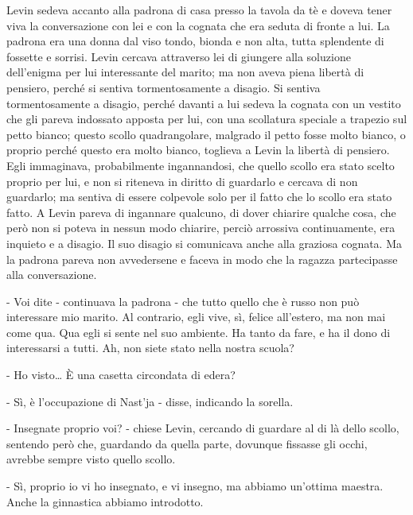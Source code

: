 Levin sedeva accanto alla padrona di casa presso la tavola da tè e doveva tener viva la conversazione con lei e con la cognata che era seduta di fronte a lui. La padrona era una donna dal viso tondo, bionda e non alta, tutta splendente di fossette e sorrisi. Levin cercava attraverso lei di giungere alla soluzione dell'enigma per lui interessante del marito; ma non aveva piena libertà di pensiero, perché si sentiva tormentosamente a disagio. Si sentiva tormentosamente a disagio, perché davanti a lui sedeva la cognata con un vestito che gli pareva indossato apposta per lui, con una scollatura speciale a trapezio sul petto bianco; questo scollo quadrangolare, malgrado il petto fosse molto bianco, o proprio perché questo era molto bianco, toglieva a Levin la libertà di pensiero. Egli immaginava, probabilmente ingannandosi, che quello scollo era stato scelto proprio per lui, e non si riteneva in diritto di guardarlo e cercava di non guardarlo; ma sentiva di essere colpevole solo per il fatto che lo scollo era stato fatto. A Levin pareva di ingannare qualcuno, di dover chiarire qualche cosa, che però non si poteva in nessun modo chiarire, perciò arrossiva continuamente, era inquieto e a disagio. Il suo disagio si comunicava anche alla graziosa cognata. Ma la padrona pareva non avvedersene e faceva in modo che la ragazza partecipasse alla conversazione. 

- Voi dite - continuava la padrona - che tutto quello che è russo non può interessare mio marito. Al contrario, egli vive, sì, felice all'estero, ma non mai come qua. Qua egli si sente nel suo ambiente. Ha tanto da fare, e ha il dono di interessarsi a tutti. Ah, non siete stato nella nostra scuola? 

- Ho visto\ldots{} È una casetta circondata di edera? 

- Sì, è l'occupazione di Nast'ja - disse, indicando la sorella. 

- Insegnate proprio voi? - chiese Levin, cercando di guardare al di là dello scollo, sentendo però che, guardando da quella parte, dovunque fissasse gli occhi, avrebbe sempre visto quello scollo. 

- Sì, proprio io vi ho insegnato, e vi insegno, ma abbiamo un'ottima maestra. Anche la ginnastica abbiamo introdotto. 

